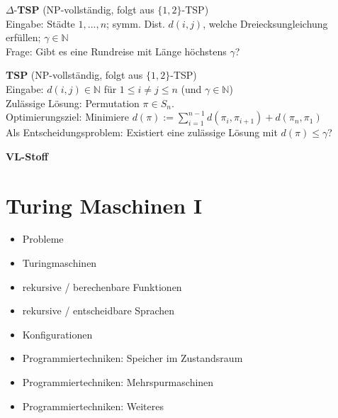\documentclass[a4paper,graphics,11pt]{article}
\begin{document}
\strut

$\Delta$-\textbf{TSP} (\textsf{NP}-vollständig, folgt aus $\{1,2\}$-TSP)
\\[5pt]
Eingabe: Städte $1,...,n$; symm. Dist. $d(i,j)$, welche Dreiecksungleichung erfüllen; $\gamma \in \mathbb{N}$
\\[5pt]
Frage: Gibt es eine Rundreise mit Länge höchstens $\gamma$?

\strut

\textbf{TSP} (\textsf{NP}-vollständig, folgt aus $\{1,2\}$-TSP)
\\[5pt]
Eingabe: $d(i,j) \in \mathbb{N}$ für $1 \leq i \neq j \leq n$ (und $\gamma \in \mathbb{N}$)
\\[5pt]
Zulässige Lösung: Permutation $\pi \in S_n$.
\\[5pt]
Optimierungsziel: Minimiere $\displaystyle d(\pi) := \sum_{i=1}^{n-1} d(\pi_i,\pi_{i+1}) + d(\pi_n, \pi_1)$ 
\\[5pt]
Als Entscheidungsproblem: Existiert eine zulässige Lösung mit $d(\pi) \leq \gamma$?


\newpage

\begin{center}
    \LARGE \textbf{VL-Stoff}
\end{center}

\section{Turing Maschinen I}

\begin{itemize}
    \item Probleme
    \item Turingmaschinen
    \item rekursive / berechenbare Funktionen
    \item rekursive / entscheidbare Sprachen
    \item Konfigurationen
    \item Programmiertechniken: Speicher im Zustandsraum
    \item Programmiertechniken: Mehrspurmaschinen
    \item Programmiertechniken: Weiteres
\end{itemize}
\end{document}
